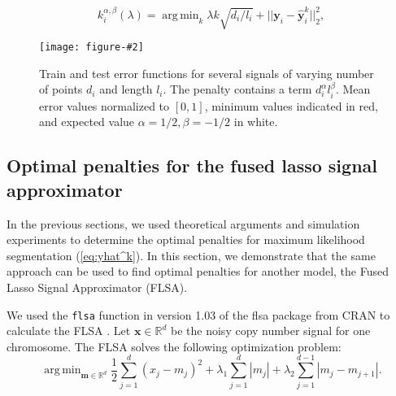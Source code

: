 \documentclass{article}
\newcommand{\fig}[3][H]{
  \begin{figure}[#1]
    \hskip -1cm
    
    \caption{#3}
    \label{fig:#2}
  \end{figure}
}
\newcommand{\figpdf}[3][H]{
  \begin{figure}[#1]
    \hskip -1cm
    \texttt{[image: figure-\#2]}
    \caption{#3}
    \label{fig:#2}
  \end{figure}
}
\DeclareMathOperator*{\argmin}{arg\,min}
\newcommand{\RR}{\mathbb{R}}
\begin{document}
\begin{equation}
  \label{eq:kstar_composite_values}
  k_i^{\alpha,\beta}(\lambda) = \argmin_k \lambda k
  \sqrt{d_i/l_i}
  + ||\mathbf y_i - \mathbf{\hat y}_i^k||^2_2,
\end{equation}

\figpdf{variable-size-error-alpha-beta}{Train and test error functions
  for several signals of varying number of points $d_i$ and length
  $l_i$. The penalty contains a term $d_i^\alpha l_i^\beta$. Mean
  error values normalized to $[0,1]$, minimum values indicated in red,
  and expected value $\alpha=1/2, \beta=-1/2$ in white. }






\newpage
\subsection{Optimal penalties for the fused lasso signal approximator}

In the previous sections, we used theoretical arguments and simulation
experiments to determine the optimal penalties for maximum likelihood
segmentation (\ref{eq:yhat^k}). In this section, we demonstrate that
the same approach can be used to find optimal penalties for another
model, the Fused Lasso Signal Approximator (FLSA).

We used the \verb|flsa| function in version 1.03 of the flsa
package from CRAN to calculate the FLSA \citep{fused-lasso-path}. Let
$\mathbf x\in\RR^d$ be the noisy copy number signal for one chromosome. The
FLSA solves the following optimization problem:
\begin{equation}
  \label{eq:flsa}
\argmin_{\mathbf m\in\RR^d} 
\frac 1 2 \sum_{j=1}^d (x_j-m_j)^2
+\lambda_1\sum_{j=1}^d|m_j|
+\lambda_2\sum_{j=1}^{d-1}|m_j-m_{j+1}|.
\end{equation}
\end{document}
